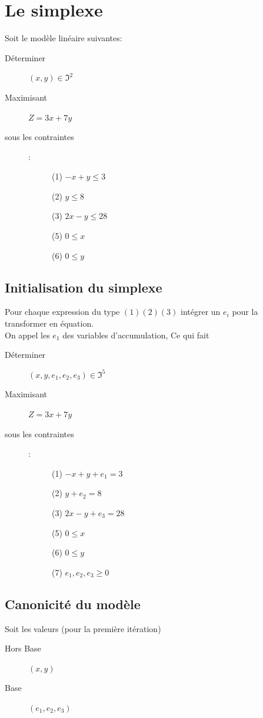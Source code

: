 \chapter{Le simplexe}
Soit le modèle linéaire suivantes:
\begin{description}
\item[Déterminer] $(x,y) \in \Im^2$
\item[Maximisant] $Z = 3x + 7y$
\item[sous les contraintes]:
\begin{description}
\item[] (1) $ -x + y \leq 3$
\item[] (2) $ y \leq 8$
\item[] (3) $ 2x - y \leq 28$
\item[] (5) $ 0 \leq x$
\item[] (6) $ 0 \leq y$
\end{description}
\end{description}

\section{Initialisation du simplexe}
Pour chaque expression du type $(1)(2)(3)$ intégrer un $e_i$ pour la transformer en équation.\\
On appel les $e_1$ des variables d'accumulation, Ce qui fait\\
\begin{description}
\item[Déterminer] $(x,y,e_1,e_2,e_3) \in \Im^5$
\item[Maximisant] $Z = 3x + 7y$
\item[sous les contraintes]:
\begin{description}
\item[] (1) $ -x + y + e_1 = 3$
\item[] (2) $ y + e_2 = 8$
\item[] (3) $ 2x - y + e_3 = 28$
\item[] (5) $ 0 \leq x$
\item[] (6) $ 0 \leq y$
\item[] (7) $ e_1,e_2,e_3 \geq 0$
\end{description}
\end{description}

\section{Canonicité du modèle}
Soit les valeurs (pour la première itération)
\begin{description}
\item[Hors Base] $(x,y)$
\item[Base] $(e_1,e_2,e_3)$
\end{description}

